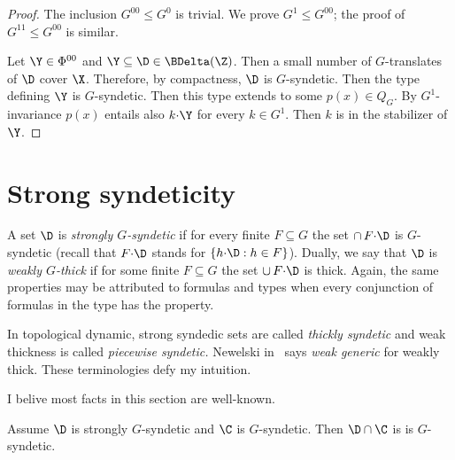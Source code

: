 \begin{proof}
  The inclusion $G^{00}\leq G^0$ is trivial.
  We prove  $G^1\leq G^{00}$; the proof of $G^{1\!1}\leq G^{00}$ is similar.

  Let $\Y\in\Phi^{00}$ and $\Y\subseteq\D\in\BDelta(\Z)$.
  Then a small number of $G$-translates of $\D$ cover $\X$.
  Therefore, by compactness, $\D$ is $G$-syndetic.
  Then the type defining $\Y$ is $G$-syndetic.
  Then this type extends to some $p(x)\in Q_G$.
  By $G^1$-in\-variance $p(x)$ entails also $k{\cdot}\Y$ for every $k\in G^1$.
  Then $k$ is in the stabilizer of $\Y$.
\end{proof}



\section{Strong syndeticity}\label{strong_syndeticity}
\def\medrel#1{\parbox[t]{5ex}{$\displaystyle\hfil #1$}}
\def\ceq#1#2#3{\parbox[t]{20ex}{$\displaystyle #1$}\medrel{#2}{$\displaystyle #3$}}


A set $\D$ is \emph{strongly $G$-syndetic\/} if for every finite $F\subseteq G$ the set $\cap\,F{\cdot}\D$ is $G$-syndetic (recall that $F{\cdot}\D$ stands for $\{h{\cdot}\D : h\in F\}$).
Dually, we say that $\D$ is \emph{weakly $G$-thick\/} if for some finite $F\subseteq G$ the set $\cup\,F{\cdot}\D$ is thick.
Again, the same properties may be attributed to formulas and types when every conjunction of formulas in the type has the property.

\noindent\llap{\textcolor{red}{\Large\warning}\kern1.5ex}\ignorespaces
In topological dynamic, strong syndedic sets are called \textit{thickly syndetic\/} and weak thickness is called \textit{piecewise syndetic.}
Newelski in~\cite{Ne} says \textit{weak generic\/} for weakly thick.
These terminologies defy my intuition.

I belive most facts in this section are well-known.

\begin{lemma}\label{lem_strongly_syndetic0}
  Assume $\D$ is strongly $G$-syndetic and $\C$ is $G$-syn\-detic.
  Then $\D\cap\C$ is is $G$-syn\-detic.
\end{lemma}

